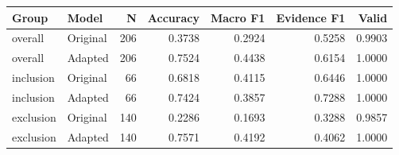 \begin{tabular}{llrrrrr}
\toprule
Group & Model & N & Accuracy & Macro F1 & Evidence F1 & Valid \\
\midrule
overall & Original & 206 & 0.3738 & 0.2924 & 0.5258 & 0.9903 \\
overall & Adapted & 206 & 0.7524 & 0.4438 & 0.6154 & 1.0000 \\
inclusion & Original & 66 & 0.6818 & 0.4115 & 0.6446 & 1.0000 \\
inclusion & Adapted & 66 & 0.7424 & 0.3857 & 0.7288 & 1.0000 \\
exclusion & Original & 140 & 0.2286 & 0.1693 & 0.3288 & 0.9857 \\
exclusion & Adapted & 140 & 0.7571 & 0.4192 & 0.4062 & 1.0000 \\
\bottomrule
\end{tabular}
